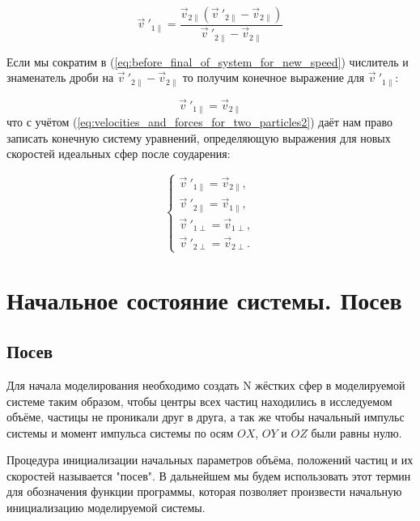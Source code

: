 \documentclass[a4paper]{article}
\begin{document}
\begin{equation}\label{eq:before_final_of_system_for_new_speed}
    \vec{v}\ '_{1\parallel} = \frac{\vec{v}_{2\parallel}( \vec{v}\ '_{2\parallel} - \vec{v}_{2\parallel})}{\vec{v}\ '_{2\parallel} - \vec{v}_{2\parallel}}
\end{equation}

Если мы сократим в (\ref{eq:before_final_of_system_for_new_speed}) числитель и знаменатель дроби на $ \vec{v}\ '_{2\parallel} - \vec{v}_{2\parallel} $ то получим конечное выражение для $ \vec{v}\ '_{1\parallel} $:

\begin{equation}\label{eq:final_of_system_for_new_speed}
    \vec{v}\ '_{1\parallel} = \vec{v}_{2\parallel}
\end{equation}
что с учётом (\ref{eq:velocities_and_forces_for_two_particles2}) даёт нам право записать конечную систему уравнений, определяющую выражения для новых скоростей идеальных сфер после соударения:

\begin{equation}\label{eq:result_for_new_speeds_after_collisions}
    \begin{cases}
        \vec{v}\ '_{1\parallel} = \vec{v}_{2\parallel},
        \\
        \vec{v}\ '_{2\parallel} = \vec{v}_{1\parallel},
        \\
        \vec{v}\ '_{1\perp} = \vec{v}_{1\perp},
        \\
        \vec{v}\ '_{2\perp} = \vec{v}_{2\perp}.
    \end{cases}
\end{equation}




\newpage
\section{Начальное состояние системы. Посев}

\subsection{Посев}

Для начала моделирования необходимо создать N жёстких сфер в моделируемой системе таким образом, чтобы центры всех частиц находились в исследуемом объёме, частицы не проникали друг в друга, а так же чтобы начальный импульс системы и момент импульса системы по осям $ OX $, $ OY $ и $ OZ $ были равны нулю.

Процедура инициализации начальных параметров объёма, положений частиц и их скоростей называется "посев". В дальнейшем мы будем использовать этот термин для обозначения функции программы, которая позволяет произвести начальную инициализацию моделируемой системы.
\end{document}
